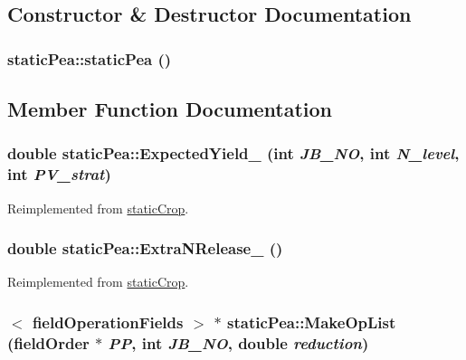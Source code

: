 \subsection{Constructor \& Destructor Documentation}
\hypertarget{classstatic_pea_a95e2886088aebc737f1d998e48b4c691}{
\subsubsection[{staticPea}]{\setlength{\rightskip}{0pt plus 5cm}staticPea::staticPea ()}}
\label{classstatic_pea_a95e2886088aebc737f1d998e48b4c691}


\subsection{Member Function Documentation}
\hypertarget{classstatic_pea_ade12e48b5d12ee356da9c38908cc8e07}{
\subsubsection[{ExpectedYield\_\-}]{\setlength{\rightskip}{0pt plus 5cm}double staticPea::ExpectedYield\_\- (int {\em JB\_\-NO}, \/  int {\em N\_\-level}, \/  int {\em PV\_\-strat})}}
\label{classstatic_pea_ade12e48b5d12ee356da9c38908cc8e07}


Reimplemented from \hyperlink{classstatic_crop_ab7b9a8ecb31b10c4dcf44f13000e2f8c}{staticCrop}.\hypertarget{classstatic_pea_afff094d1caf8424d869bb8623284b536}{
\subsubsection[{ExtraNRelease\_\-}]{\setlength{\rightskip}{0pt plus 5cm}double staticPea::ExtraNRelease\_\- ()}}
\label{classstatic_pea_afff094d1caf8424d869bb8623284b536}


Reimplemented from \hyperlink{classstatic_crop_afe0cb8a7831afa941a37338f05227d67}{staticCrop}.\hypertarget{classstatic_pea_a4e65ffc0e08921e18f95be49b3e12422}{
\subsubsection[{MakeOpList}]{$<$ {\bf fieldOperationFields} $>$ $\ast$ staticPea::MakeOpList ({\bf fieldOrder} $\ast$ {\em PP}, \/  int {\em JB\_\-NO}, \/  double {\em reduction})}}
\label{classstatic_pea_a4e65ffc0e08921e18f95be49b3e12422}


